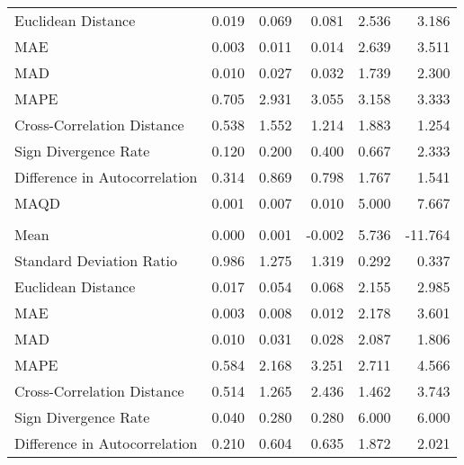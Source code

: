 \begin{landscape}
\begin{ThreePartTable}
\begin{longtable}[t]{lrrrrr}
\hspace{1em}Euclidean Distance & 0.019 & 0.069 & 0.081 & 2.536 & 3.186\\
\hspace{1em}MAE & 0.003 & 0.011 & 0.014 & 2.639 & 3.511\\
\hspace{1em}MAD & 0.010 & 0.027 & 0.032 & 1.739 & 2.300\\
\hspace{1em}MAPE & 0.705 & 2.931 & 3.055 & 3.158 & 3.333\\
\hspace{1em}Cross-Correlation Distance & 0.538 & 1.552 & 1.214 & 1.883 & 1.254\\
\hspace{1em}Sign Divergence Rate & 0.120 & 0.200 & 0.400 & 0.667 & 2.333\\
\hspace{1em}Difference in Autocorrelation & 0.314 & 0.869 & 0.798 & 1.767 & 1.541\\
\hspace{1em}MAQD & 0.001 & 0.007 & 0.010 & 5.000 & 7.667\\
\addlinespace[0.5em]
\multicolumn{6}{l}{\textbf{PRT}}\\
\hline
\hspace{1em}Mean & 0.000 & 0.001 & -0.002 & 5.736 & -11.764\\
\hspace{1em}Standard Deviation Ratio & 0.986 & 1.275 & 1.319 & 0.292 & 0.337\\
\hspace{1em}Euclidean Distance & 0.017 & 0.054 & 0.068 & 2.155 & 2.985\\
\hspace{1em}MAE & 0.003 & 0.008 & 0.012 & 2.178 & 3.601\\
\hspace{1em}MAD & 0.010 & 0.031 & 0.028 & 2.087 & 1.806\\
\hspace{1em}MAPE & 0.584 & 2.168 & 3.251 & 2.711 & 4.566\\
\hspace{1em}Cross-Correlation Distance & 0.514 & 1.265 & 2.436 & 1.462 & 3.743\\
\hspace{1em}Sign Divergence Rate & 0.040 & 0.280 & 0.280 & 6.000 & 6.000\\
\hspace{1em}Difference in Autocorrelation & 0.210 & 0.604 & 0.635 & 1.872 & 2.021\\

\end{longtable}
\end{ThreePartTable}
\end{landscape}

